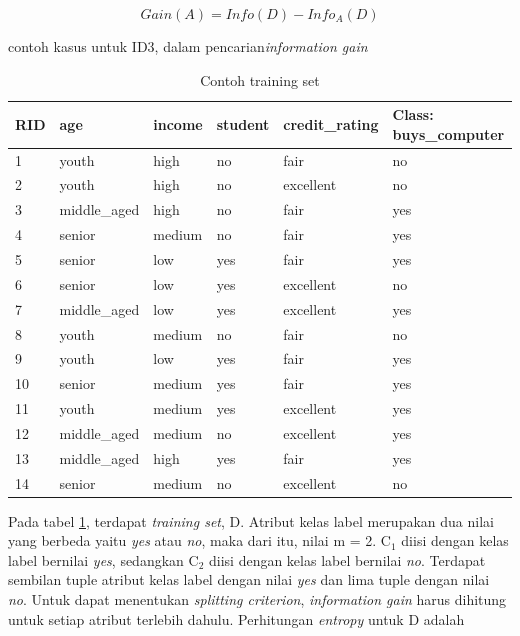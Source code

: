 \begin{displaymath}
	Gain(A) = Info(D) - Info_A(D)
\end{displaymath}

contoh kasus untuk ID3, dalam pencarian\textsl{information gain}

\begin{table}[h]
\caption{Contoh training set}
\label{table:contohTrainingSet}
\begin{tabular}{|l|l|l|l|l|l|}
\hline
RID & age          & income & student & credit\_rating & Class: buys\_computer \\ \hline
1   & youth        & high   & no      & fair           & no                    \\ \hline
2   & youth        & high   & no      & excellent      & no                    \\ \hline
3   & middle\_aged & high   & no      & fair           & yes                   \\ \hline
4   & senior       & medium & no      & fair           & yes                   \\ \hline
5   & senior       & low    & yes     & fair           & yes                   \\ \hline
6   & senior       & low    & yes     & excellent      & no                    \\ \hline
7   & middle\_aged & low    & yes     & excellent      & yes                   \\ \hline
8   & youth        & medium & no      & fair           & no                    \\ \hline
9   & youth        & low    & yes     & fair           & yes                   \\ \hline
10  & senior       & medium & yes     & fair           & yes                   \\ \hline
11  & youth        & medium & yes     & excellent      & yes                   \\ \hline
12  & middle\_aged & medium & no      & excellent      & yes                   \\ \hline
13  & middle\_aged & high   & yes     & fair           & yes                   \\ \hline
14  & senior       & medium & no      & excellent      & no                    \\ \hline
\end{tabular}
\end{table}

Pada tabel \ref{table:contohTrainingSet}, terdapat \textsl{training set}, D. Atribut kelas label merupakan dua nilai yang berbeda yaitu \textsl{yes} atau \textsl{no}, maka dari itu, nilai m = 2. C$_{1}$ diisi dengan kelas label bernilai \textsl{yes}, sedangkan C$_{2}$ diisi dengan kelas label bernilai \textsl{no}. Terdapat sembilan tuple atribut kelas label dengan nilai \textsl{yes} dan lima tuple dengan nilai \textsl{no}. Untuk dapat menentukan \textsl{splitting criterion}, \textsl{information gain} harus dihitung untuk setiap atribut terlebih dahulu. Perhitungan \textsl{entropy} untuk D adalah

